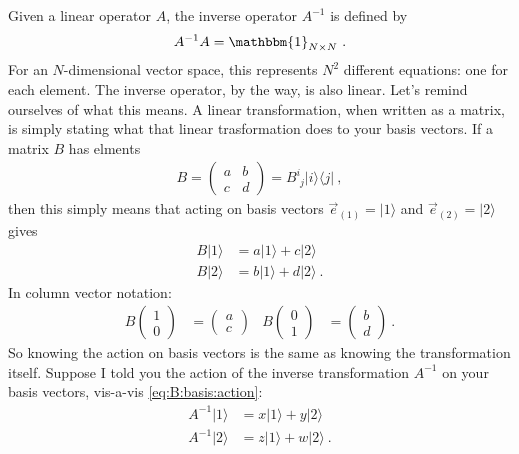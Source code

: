 Given a linear operator $A$, the inverse operator $A^{-1}$ is defined by
\begin{align}
  A^{-1} A = \mathbbm{1}_{N\times N} \ .
\end{align}
For an $N$-dimensional vector space, this represents $N^2$ different equations: one for each element. The inverse operator, by the way, is also linear. Let's remind ourselves of what this means. A linear transformation, when written as a matrix, is simply stating what that linear trasformation does to your basis vectors. If a matrix $B$ has elments
\begin{align}
  B = 
  \begin{pmatrix}
    a & b\\
    c & d
  \end{pmatrix}
  = 
  B^{i}_{\phantom{i}j} |i\rangle\langle j| \ , 
\end{align}
then this simply means that acting on basis vectors $\vec{e}_{(1)} = |1\rangle$ and $\vec{e}_{(2)} = |2\rangle$ gives
\begin{align}
  B|1\rangle &= a |1 \rangle + c|2\rangle 
  \\
  B|2\rangle &= b |1 \rangle + d|2\rangle  \ .
  \label{eq:B:basis:action}
\end{align}
In column vector notation:
\begin{align}
  B
  \begin{pmatrix}
  1 \\ 0
  \end{pmatrix}
  &= 
  \begin{pmatrix}
  a \\ c
  \end{pmatrix}
  &
  B
  \begin{pmatrix}
  0 \\ 1
  \end{pmatrix}
  &=
  \begin{pmatrix}
  b \\ d
  \end{pmatrix}\ .
\end{align}
So knowing the action on basis vectors is the same as knowing the transformation itself. Suppose I told you the action of the inverse transformation $A^{-1}$ on your basis vectors, vis-a-vis \eqref{eq:B:basis:action}:
\begin{align}
  A^{-1}|1\rangle &= x |1 \rangle + y|2\rangle 
  \\
  A^{-1}|2\rangle &= z |1 \rangle + w|2\rangle  \ .
  \label{eq:Ainv:basis:action}
\end{align}
